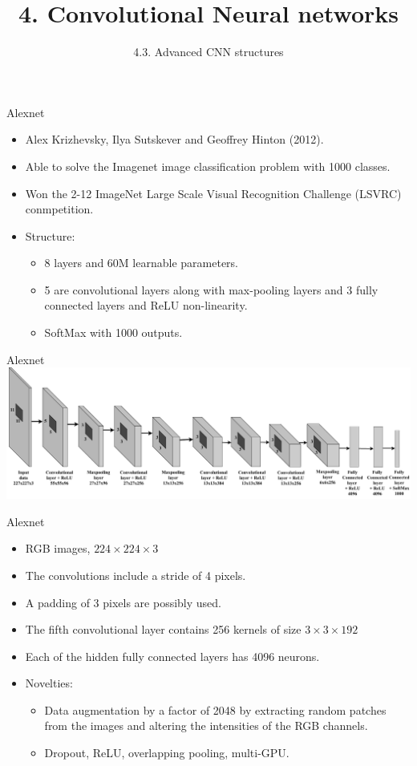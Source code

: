 \documentclass{beamer}
\title{4. Convolutional Neural networks}
\subtitle{4.3. Advanced CNN structures}
\begin{document}
\maketitle


\begin{frame}{Alexnet }
\begin{itemize}
    \item Alex Krizhevsky, Ilya Sutskever and Geoffrey Hinton (2012).
    \item Able to solve the Imagenet image classification problem with 1000 classes. 
    \item Won the 2-12 ImageNet Large Scale Visual Recognition Challenge (LSVRC) conmpetition.
    \item Structure:
    \begin{itemize}
     \item 8 layers and 60M learnable parameters. 
     \item  5 are convolutional layers along with max-pooling layers and 3 fully connected layers and ReLU non-linearity. \item SoftMax with 1000 outputs.
     \end{itemize}
\end{itemize}
\end{frame}
\begin{frame}{Alexnet}
    \includegraphics[width=\textwidth]{Module 4 (CNN)/pics/alexnet.pdf}
\end{frame}
\begin{frame}{Alexnet}
\begin{itemize}
    \item RGB images,  $224\times 224 \times 3$ 
    \item The convolutions include a stride of 4 pixels. 
    \item A padding of 3 pixels are possibly used. 
    \item  The fifth convolutional layer contains 256 kernels of size $3\times 3\times 192$ 
    \item Each of the hidden fully connected layers has 4096 neurons. 
    \item Novelties:
    \begin{itemize}
    \item Data augmentation by a factor of 2048 by extracting random patches from the images and altering the intensities of the RGB channels. 
    \item Dropout, ReLU, overlapping pooling, multi-GPU.
    \end{itemize}
\end{itemize}
\end{frame}
\end{document}
